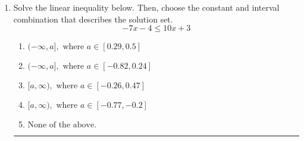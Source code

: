 \documentclass[14pt]{extbook}
\newcommand{\litem}[1]{\item#1\hspace*{-1cm}\rule{\textwidth}{0.4pt}}
\begin{document}
\begin{enumerate}
{\begin{enumerate}[label=\Alph*.]
\end{enumerate} }
\litem{
Solve the linear inequality below. Then, choose the constant and interval combination that describes the solution set.\[ -7x -4 \leq 10x + 3 \]\begin{enumerate}[label=\Alph*.]
\item \( (-\infty, a], \text{ where } a \in [0.29, 0.5] \)
\item \( (-\infty, a], \text{ where } a \in [-0.82, 0.24] \)
\item \( [a, \infty), \text{ where } a \in [-0.26, 0.47] \)
\item \( [a, \infty), \text{ where } a \in [-0.77, -0.2] \)
\item \( \text{None of the above}. \)

\end{enumerate} }
\end{enumerate}
\end{document}
